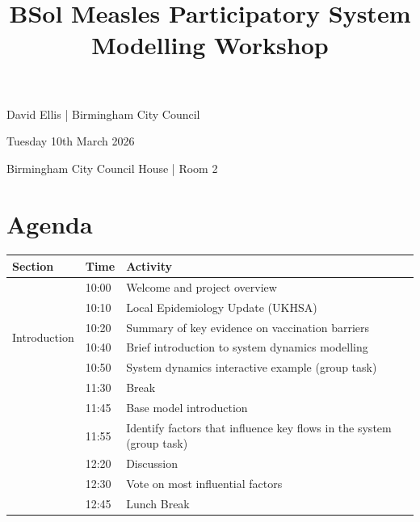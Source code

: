 \documentclass{article}
\title{BSol Measles Participatory System Modelling Workshop}
\author{}
\date{}
\begin{document}
\begin{titlepage}

\maketitle

\vspace{-50px}
\begin{center}
    \begin{Large}
        David Ellis | Birmingham City Council \vspace{10px}
        
        Tuesday 10th March 2026 \vspace{10px}
    
        Birmingham City Council House | Room 2
    \end{Large}
\end{center}

\section*{Agenda}

\begin{table}[h]
\centering
\begin{tabular}{lll}
\toprule
\textbf{Section} & \textbf{Time} & \textbf{Activity} \\
\midrule

\multirow{6}{*}{Introduction}
& 10:00 & Welcome and project overview \\
& 10:10 & Local Epidemiology Update (UKHSA) \\
& 10:20 & Summary of key evidence on vaccination barriers \\
& 10:40 & Brief introduction to system dynamics modelling \\
& 10:50 & System dynamics interactive example (group task) \\
& 11:30 & Break \\

\addlinespace
\midrule

\multirow{5}{*}{Model Building}
& 11:45 & Base model introduction \\
& 11:55 & Identify factors that influence key flows in the system (group task) \\
& 12:20 & Discussion \\
& 12:30 & Vote on most influential factors \\
& 12:45 & Lunch Break \\


\end{tabular}
\end{table}
\end{titlepage}
\end{document}
